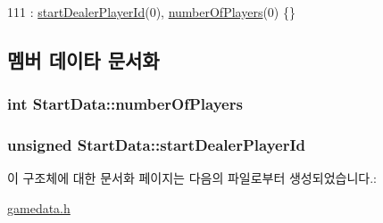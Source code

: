 \begin{DoxyCode}
111 : \hyperlink{struct_start_data_a3857fbb0e5191f2352fcee6c891c704f}{startDealerPlayerId}(0), \hyperlink{struct_start_data_a962ea391fe81cc9d28ac7ec7ea511afc}{numberOfPlayers}(0) \{\}
\end{DoxyCode}


\subsection{멤버 데이타 문서화}
\hypertarget{struct_start_data_a962ea391fe81cc9d28ac7ec7ea511afc}{
\subsubsection[{number\-Of\-Players}]{\setlength{\rightskip}{0pt plus 5cm}int Start\-Data\-::number\-Of\-Players}}\label{struct_start_data_a962ea391fe81cc9d28ac7ec7ea511afc}
\hypertarget{struct_start_data_a3857fbb0e5191f2352fcee6c891c704f}{
\subsubsection[{start\-Dealer\-Player\-Id}]{\setlength{\rightskip}{0pt plus 5cm}unsigned Start\-Data\-::start\-Dealer\-Player\-Id}}\label{struct_start_data_a3857fbb0e5191f2352fcee6c891c704f}


이 구조체에 대한 문서화 페이지는 다음의 파일로부터 생성되었습니다.\-:\begin{DoxyCompactItemize}
\item 
\hyperlink{gamedata_8h}{gamedata.\-h}\end{DoxyCompactItemize}
